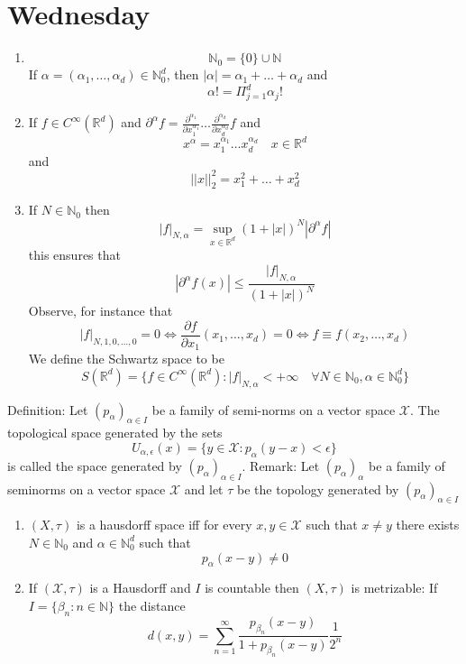 \documentclass[11pt]{article}
\begin{document}
\section{Wednesday}
\begin{enumerate}
    \item 
        \[
            \mathbb{N}_0 = \{0\} \cup \mathbb{N}
        \] 
        If $\alpha = (\alpha_1,\dots,\alpha_d) \in \mathbb{N}_0^{d}$, then $ |\alpha| = \alpha_1 + \dots + \alpha_d$
        and
        \[
            \alpha! = \Pi_{j=1}^{d}\alpha_j!
        \] 
    \item If $f\in C^{\infty}( \mathbb{R}^{d})$ and $\partial^{\alpha}f = \frac{\partial^{\alpha_1}}{\partial x_1^{\alpha_1}} \dots \frac{\partial^{\alpha_d}}{\partial x_d^{\alpha_d}} f$ 
        and
        \[
        x^{\alpha} = x_1^{\alpha_1}\dots x_d^{\alpha_d} \quad x \in \mathbb{R}^{d}
        \] 
        and
        \[
        ||x||_2^2 = x_1^2 + \dots + x_d^2
        \] 
    \item If $N \in \mathbb{N}_0$ then
        \[
            |f|_{N,\alpha} = \sup_{x \in \mathbb{R}^{d}} (1+|x|)^{N} |\partial^{\alpha}f|
        \] 
        this ensures that
        \[
           |\partial^{\alpha} f(x)|  \le \frac{|f|_{N,\alpha}}{(1 + |x|)^{N}} 
        \] 
        Observe, for instance that
        \[
            |f|_{N,1,0,\dots,0} = 0 \iff \frac{\partial f}{\partial x_1}(x_1,\dots,x_d) = 0 \iff f \equiv f(x_2,\dots,x_d)
        \] 
        We define the Schwartz space to be 
        \[
            S( \mathbb{R}^{d}) = \{f \in C^{\infty}( \mathbb{R}^{d}) : |f|_{N,\alpha} < +\infty \quad \forall N \in \mathbb{N}_0, \alpha \in \mathbb{N}_0^{d}\}
        \] 
\end{enumerate}
Definition: Let $(p_\alpha)_{\alpha \in I}$ be a family of semi-norms on a vector space $ \mathcal{X}$. The topological space
generated by the sets
\[
    U_{\alpha,\epsilon}(x) = \{y \in \mathcal{X} : p_\alpha(y-x) < \epsilon\}
\] 
is called the space generated  by $(p_\alpha)_{\alpha \in I}$.
Remark: Let $(p_\alpha)_\alpha$ be a family of seminorms on a vector space $ \mathcal{X}$
and let $\tau$ be the topology generated by  $(p_\alpha)_{\alpha \in I}$
\begin{enumerate}
    \item $(X, \tau)$ is a hausdorff space iff for every $x,y \in \mathcal{X}$ such that $x \ne y$
        there exists   $ N \in \mathbb{N}_0$ and $\alpha \in \mathbb{N}_0^{d}$ such that 
        \[
        p_\alpha(x-y) \ne 0
        \] 
    \item 
        If $ ( \mathcal{X}, \tau)$ is a Hausdorff and $ I$ is countable
        then $( X, \tau)$ is metrizable: If  $I = \{\beta_n : n \in \mathbb{N}\}$
        the distance
        \[
            d(x,y) = \sum_{n=1}^{\infty}\frac{p_{\beta_n}(x-y)}{1+ p_{\beta_n}(x-y)} \frac{1}{2^{n}}
        \] 
\end{enumerate}
\end{document}
